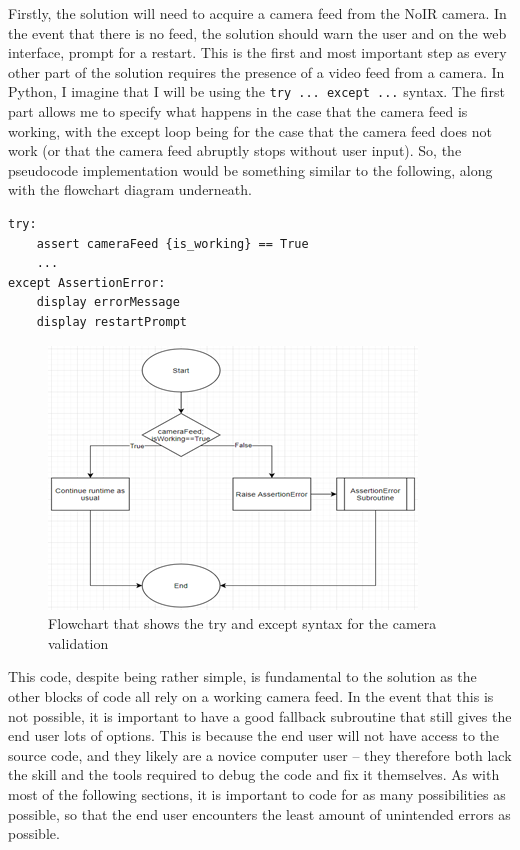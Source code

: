 \documentclass[9pt]{article}
\begin{document}
Firstly, the solution will need to acquire a camera feed from the NoIR camera. In the event that there is no feed, the solution should warn the user and on the web interface, prompt for a restart. This is the first and most important step as every other part of the solution requires the presence of a video feed from a camera. In Python, I imagine that I will be using the \texttt{try ... except ...} syntax. The first part allows me to specify what happens in the case that the camera feed is working, with the except loop being for the case that the camera feed does not work (or that the camera feed abruptly stops without user input).
So, the pseudocode implementation would be something similar to the following, along with the flowchart diagram underneath.

\begin{lstlisting}
try:
	assert cameraFeed {is_working} == True
	...
except AssertionError:
	display errorMessage
	display restartPrompt
\end{lstlisting}
\begin{figure}[H]
	\centering
	\includegraphics{flowCameraworking.png}
	\caption{Flowchart that shows the try and except syntax for the camera validation}\label{fig_cameraWorking}
\end{figure}
This code, despite being rather simple, is fundamental to the solution as the other blocks of code all rely on a working camera feed. In the event that this is not possible, it is important to have a good fallback subroutine that still gives the end user lots of options. This is because the end user will not have access to the source code, and they likely are a novice computer user – they therefore both lack the skill and the tools required to debug the code and fix it themselves. As with most of the following sections, it is important to code for as many possibilities as possible, so that the end user encounters the least amount of unintended errors as possible.\\\\
\end{document}
